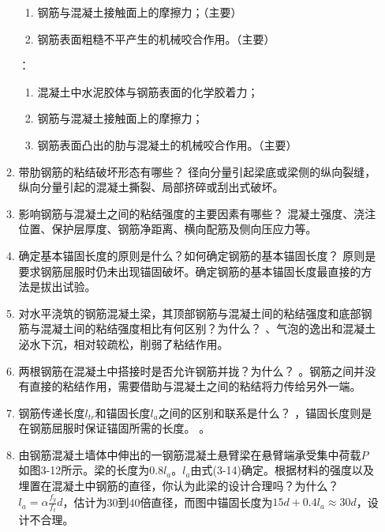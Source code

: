 \documentclass{article}
\begin{document}
\begin{enumerate}
\begin{enumerate}[1.]
\begin{enumerate}
                        \item 钢筋与混凝土接触面上的摩擦力；（主要）
                        \item 钢筋表面粗糙不平产生的机械咬合作用。（主要）
                    \end{enumerate}
                    ：\begin{enumerate}
                        \item 混凝土中水泥胶体与钢筋表面的化学胶着力；
                        \item 钢筋与混凝土接触面上的摩擦力；
                        \item 钢筋表面凸出的肋与混凝土的机械咬合作用。（主要）
                    \end{enumerate}
              \item 带肋钢筋的粘结破坏形态有哪些？
                    \ans 径向分量引起梁底或梁侧的纵向裂缝，纵向分量引起的混凝土撕裂、局部挤碎或刮出式破坏。
              \item 影响钢筋与混凝土之间的粘结强度的主要因素有哪些？
                    \ans 混凝土强度、浇注位置、保护层厚度、钢筋净距离、横向配筋及侧向压应力等。
              \item 确定基本锚固长度的原则是什么？如何确定钢筋的基本锚固长度？
                    \ans 原则是要求钢筋屈服时仍未出现锚固破坏。确定钢筋的基本锚固长度最直接的方法是拔出试验。
              \item 对水平浇筑的钢筋混凝土梁，其顶部钢筋与混凝土间的粘结强度和底部钢筋与混凝土间的粘结强度相比有何区别？为什么？
                    、气泡的逸出和混凝土泌水下沉，相对较疏松，削弱了粘结作用。
              \item 两根钢筋在混凝土中搭接时是否允许钢筋并拢？为什么？
                    。钢筋之间并没有直接的粘结作用，需要借助与混凝土之间的粘结将力传给另外一端。
              \item 钢筋传递长度$l_{tr}$和锚固长度$l_a$之间的区别和联系是什么？
                    ，锚固长度则是在钢筋屈服时保证锚固所需的长度。
                    。
              \item 由钢筋混凝土墙体中伸出的一钢筋混凝土悬臂梁在悬臂端承受集中荷载$P$如图3-12所示。梁的长度为$0.8l_a$。$l_a$由式(3-14)确定。根据材料的强度以及埋置在混凝土中钢筋的直径，你认为此梁的设计合理吗？为什么？
                    $l_a=\alpha\frac{f_y}{f_t}d$，估计为30到40倍直径，而图中锚固长度为$15d+0.4l_a\approx30d$，设计不合理。

\end{enumerate}
\end{enumerate}
\end{document}
